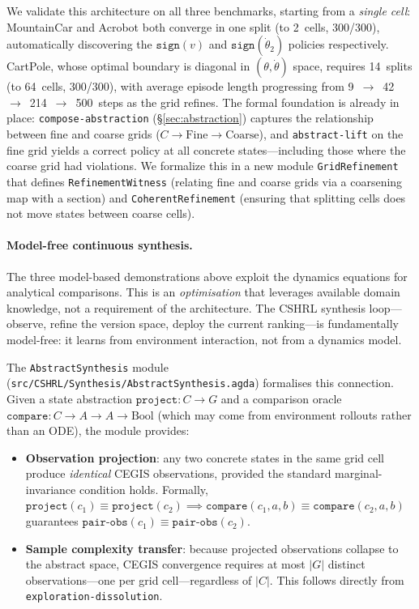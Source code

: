 \documentclass[9pt,a4paper]{article}
\newcommand{\fpath}[1]{\nolinkurl{#1}}
\theoremstyle{plain}
\theoremstyle{definition}
\theoremstyle{remark}
\begin{document}
We validate this architecture on all three benchmarks, starting from a \emph{single cell}:
MountainCar and Acrobot both converge in one split (to 2~cells, 300/300), automatically discovering the $\texttt{sign}(v)$ and $\texttt{sign}(\dot\theta_2)$ policies respectively.
CartPole, whose optimal boundary is diagonal in $(\theta,\dot\theta)$ space, requires 14~splits (to 64~cells, 300/300), with average episode length progressing from 9~$\to$~42~$\to$~214~$\to$~500~steps as the grid refines.
The formal foundation is already in place: \texttt{compose-abstraction} (\S\ref{sec:abstraction}) captures the relationship between fine and coarse grids ($C \to \text{Fine} \to \text{Coarse}$), and \texttt{abstract-lift} on the fine grid yields a correct policy at all concrete states---including those where the coarse grid had violations.  We formalize this in a new module \texttt{GridRefinement} that defines \texttt{RefinementWitness} (relating fine and coarse grids via a coarsening map with a section) and \texttt{CoherentRefinement} (ensuring that splitting cells does not move states between coarse cells).

\paragraph{Model-free continuous synthesis.}
The three model-based demonstrations above exploit the dynamics equations for analytical comparisons.  This is an \emph{optimisation} that leverages available domain knowledge, not a requirement of the architecture.  The CSHRL synthesis loop---observe, refine the version space, deploy the current ranking---is fundamentally model-free: it learns from environment interaction, not from a dynamics model.

The \texttt{AbstractSynthesis} module (\fpath{src/CSHRL/Synthesis/AbstractSynthesis.agda}) formalises this connection.  Given a state abstraction $\texttt{project} : C \to G$ and a comparison oracle $\texttt{compare} : C \to A \to A \to \text{Bool}$ (which may come from environment rollouts rather than an ODE), the module provides:

\begin{itemize}
\item \textbf{Observation projection}: any two concrete states in the same grid cell produce \emph{identical} CEGIS observations, provided the standard marginal-invariance condition holds.  Formally, $\texttt{project}(c_1) \equiv \texttt{project}(c_2) \implies \texttt{compare}(c_1, a, b) \equiv \texttt{compare}(c_2, a, b)$ guarantees $\texttt{pair-obs}(c_1) \equiv \texttt{pair-obs}(c_2)$.
\item \textbf{Sample complexity transfer}: because projected observations collapse to the abstract space, CEGIS convergence requires at most $|G|$ distinct observations---one per grid cell---regardless of $|C|$.  This follows directly from \texttt{exploration-dissolution}.
\end{itemize}
\end{document}
